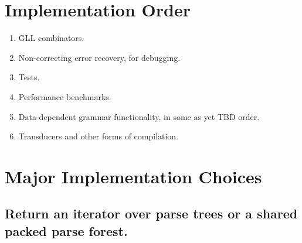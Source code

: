 \documentclass[12pt]{article}
\begin{document}
\section{Implementation Order}
\label{sec:implementation_order}

\begin{enumerate}
\item GLL combinators.
\item Non-correcting error recovery, for debugging.
\item Tests.
\item Performance benchmarks.
\item Data-dependent grammar functionality, in some as yet TBD order.
\item Transducers and other forms of compilation.
\end{enumerate}


\section{Major Implementation Choices}
\label{sec:implementation_choices}

\subsection{Return an iterator over parse trees or a shared packed
  parse forest.}
\label{sec:iterator_sppf}
\end{document}
